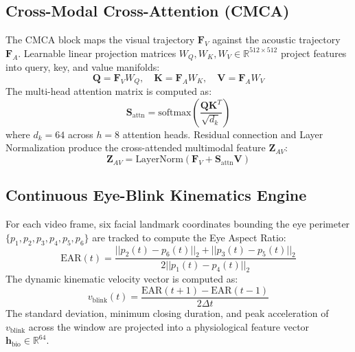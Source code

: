 \documentclass[journal]{IEEEtran}
\begin{document}
\subsection{Cross-Modal Cross-Attention (CMCA)}
The CMCA block maps the visual trajectory $\mathbf{F}_V$ against the acoustic trajectory $\mathbf{F}_A$. Learnable linear projection matrices $W_Q, W_K, W_V \in \mathbb{R}^{512 \times 512}$ project features into query, key, and value manifolds:
\begin{equation}
\mathbf{Q} = \mathbf{F}_V W_Q, \quad \mathbf{K} = \mathbf{F}_A W_K, \quad \mathbf{V} = \mathbf{F}_A W_V
\end{equation}
The multi-head attention matrix is computed as:
\begin{equation}
\mathbf{S}_{\text{attn}} = \text{softmax}\left( \frac{\mathbf{Q} \mathbf{K}^T}{\sqrt{d_k}} \right)
\end{equation}
where $d_k = 64$ across $h = 8$ attention heads. Residual connection and Layer Normalization produce the cross-attended multimodal feature $\mathbf{Z}_{AV}$:
\begin{equation}
\mathbf{Z}_{AV} = \text{LayerNorm}\left( \mathbf{F}_V + \mathbf{S}_{\text{attn}} \mathbf{V} \right)
\end{equation}

\subsection{Continuous Eye-Blink Kinematics Engine}
For each video frame, six facial landmark coordinates bounding the eye perimeter $\{p_1, p_2, p_3, p_4, p_5, p_6\}$ are tracked to compute the Eye Aspect Ratio:
\begin{equation}
\text{EAR}(t) = \frac{||p_2(t) - p_6(t)||_2 + ||p_3(t) - p_5(t)||_2}{2 ||p_1(t) - p_4(t)||_2}
\end{equation}
The dynamic kinematic velocity vector is computed as:
\begin{equation}
v_{\text{blink}}(t) = \frac{\text{EAR}(t + 1) - \text{EAR}(t - 1)}{2 \Delta t}
\end{equation}
The standard deviation, minimum closing duration, and peak acceleration of $v_{\text{blink}}$ across the window are projected into a physiological feature vector $\mathbf{h}_{\text{bio}} \in \mathbb{R}^{64}$.
\end{document}
